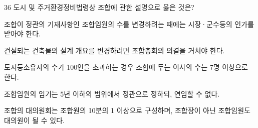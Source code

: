 \begin{question}{36}
도시 및 주거환경정비법령상 조합에 관한 설명으로 옳은 것은?
\begin{choices}
  \item 조합이 정관의 기재사항인 조합임원의 수를 변경하려는 때에는 시장·군수등의 인가를 받아야 한다.
  \item 건설되는 건축물의 설계 개요를 변경하려면 조합총회의 의결을 거쳐야 한다.
  \item 토지등소유자의 수가 100인을 초과하는 경우 조합에 두는 이사의 수는 7명 이상으로 한다.
  \item 조합임원의 임기는 5년 이하의 범위에서 정관으로 정하되, 연임할 수 없다.
  \item 조합의 대의원회는 조합원의 10분의 1 이상으로 구성하며, 조합장이 아닌 조합임원도 대의원이 될 수 있다.
\end{choices}
\end{question}
\answerall
{}
